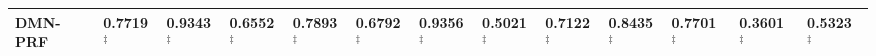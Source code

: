 \begin{table*}[]
\begin{tabular}{l|l l l l | l l l l | l l l l}
		DMN-PRF  & \textbf{0.7719}$^\ddagger$ & \textbf{0.9343}$^\ddagger$   & \textbf{0.6552}$^\ddagger$   & \textbf{0.7893}$^\ddagger$   & \textbf{0.6792}$^\ddagger$ & \textbf{0.9356}$^\ddagger$   & \textbf{0.5021}$^\ddagger$   & \textbf{0.7122}$^\ddagger$   & \textbf{0.8435}$^\ddagger$ & \textbf{0.7701} $^\ddagger$  & \textbf{0.3601} $^\ddagger$  & \textbf{0.5323} $^\ddagger$  \\ \hline \hline
	\end{tabular}
\end{table*}


